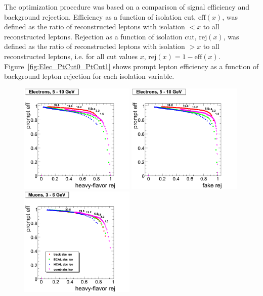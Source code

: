 \documentclass{cmspaper}
\begin{document}
The optimization procedure was based on a comparison of signal efficiency and background rejection.
Efficiency as a function of isolation cut, $\textrm{eff}(x)$, was defined as the ratio of
reconstructed leptons with isolation $< x$ to all reconstructed leptons. Rejection as a function of
isolation cut, $\textrm{rej}(x)$, was defined as the ratio of reconstructed leptons
with isolation $> x$ to all reconstructed leptons, i.e. for all cut values $x$,
$\textrm{rej}(x) = 1 - \textrm{eff}(x)$. Figure~\ref{fig:Elec_PtCut0_PtCut1}
shows prompt lepton efficiency as a function of background lepton
rejection for each isolation variable.

\begin{figure}[htbp]
\begin{center}
   \includegraphics[width = 0.49\textwidth]{pictures/bkgdRej_sigEff/elec_nonPrompt_ptCut0_ptCut1.png}
   \includegraphics[width = 0.49\textwidth]{pictures/bkgdRej_sigEff/elec_fake_ptCut0_ptCut1.png} \\
   \includegraphics[width = 0.49\textwidth]{pictures/bkgdRej_sigEff/muon_nonPrompt_ptCut0_ptCut1.png}

\end{center}
\end{figure}
\end{document}
